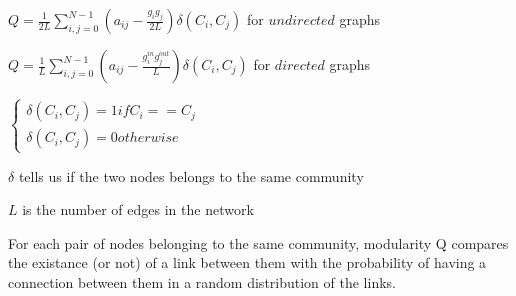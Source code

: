 \documentclass[12pt]{article}
\begin{document}
\begin{center}

	$Q = \frac{1}{2L} \sum_{i, j = 0}^{N - 1}(a_{ij} - \frac{g_i g_j}{2L}) \delta (C_i, C_j)$ for $undirected$ graphs

	\vspace{20px}

	$Q = \frac{1}{L} \sum_{i, j = 0}^{N - 1}(a_{ij} - \frac{g_i^{in} g_j^{out}}{L}) \delta (C_i, C_j)$ for $directed$ graphs

	\vspace{20px}

	$\begin{cases}
		
		\delta (C_i, C_j) = 1 if C_i == C_j \\

		\delta (C_i, C_j) = 0 otherwise

	\end{cases}$

	\vspace{20px}

	$\delta$ tells us if the two nodes belongs to the same community

	$L$ is the number of edges in the network

\end{center}

For each pair of nodes belonging to the same community, modularity Q compares the existance (or not) of a link between them with the probability of having a connection between them in a random distribution of the links. 

\vspace{20px}
\end{document}
